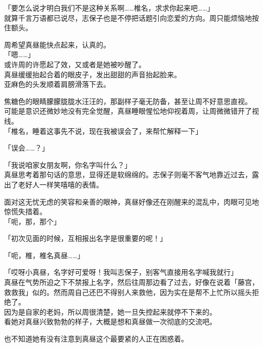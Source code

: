 「要怎么说才明白我们不是这种关系啊……椎名，求求你起来吧……」\\

就算千言万语都已说尽，志保子也是不停把话题引向恋爱的方向。周只能烦恼地按住额头。

周希望真昼能快点起来，认真的。\\

「嗯……」\\

或许周的许愿起了效，又或者是她被吵醒了。\\

真昼缓缓抬起合着的眼皮子，发出甜甜的声音抬起脸来。\\

亚麻色的头发顺着肩膀滑落下去。

焦糖色的眼睛朦朦胧胧水汪汪的，那副样子毫无防备，甚至让周不好意思直视。\\

可能是意识还微妙地没有完全觉醒，真昼睡眼惺忪地仰视着周，让周微微错开了视线。\\

「椎名，睡着这事先不说，现在我被误会了，来帮忙解释一下」

「误会……？」

「我说咱家女朋友啊，你名字叫什么？」\\

真昼思考着那句话的意思，显得还是软绵绵的。志保子则毫不客气地靠近过去，露出了老好人一样笑嘻嘻的表情。

面对这无忧无虑的笑容和亲善的眼神，真昼好像还在刚醒来的混乱中，肉眼可见地惊慌失措着。\\

「呃，那，那个」

「初次见面的时候，互相报出名字是很重要的呢！」

「呃，椎，椎名真昼……」

「哎呀小真昼，名字好可爱呀！我叫志保子，别客气直接用名字喊我就行」\\

真昼在气势所迫之下不禁报上名字，然后往周那边看了过去，好像在说着「藤宫，救救我」似的。然而周自己还巴不得别人来救他，因为实在是帮不上忙所以摇头拒绝了。\\

因为是自家的老妈，所以周很清楚，她一旦失控起来就停不下来的。\\

看她对真昼兴致勃勃的样子，大概是想和真昼做一次彻底的交流吧。

也不知道她有没有注意到真昼这个最要紧的人正在困惑着。\\

